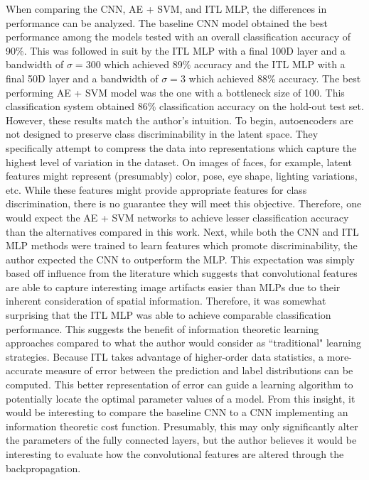 \documentclass[conference]{IEEEtran}
\begin{document}
When comparing the CNN, AE + SVM, and ITL MLP, the differences in performance can be analyzed.  The baseline CNN model obtained the best performance among the models tested with an overall classification accuracy of 90\%.  This was followed in suit by the ITL MLP with a final 100D layer and a bandwidth of $\sigma=300$ which achieved 89\% accuracy and the ITL MLP with a final 50D layer and a bandwidth of $\sigma=3$ which achieved 88\% accuracy.  The best performing AE + SVM model was the one with a bottleneck size of 100.  This classification system obtained 86\% classification accuracy on the hold-out test set.  However, these results match the author's intuition.  To begin, autoencoders are not designed to preserve class discriminability in the latent space.  They specifically attempt to compress the data into  representations which capture the highest level of variation in the dataset.  On images of faces, for example, latent features might represent (presumably) color, pose, eye shape, lighting variations, etc.  While these features might provide appropriate features for class discrimination, there is no guarantee they will meet this objective.  Therefore, one would expect the AE + SVM networks to achieve lesser classification accuracy than the alternatives compared in this work.  Next, while both the CNN and ITL MLP methods were trained to  learn features which promote discriminability, the author expected the CNN to outperform the MLP.  This expectation was simply based off influence from the literature which suggests that convolutional features are able to capture interesting image artifacts easier than MLPs due to their inherent consideration of spatial information.  Therefore, it was somewhat surprising that the ITL MLP was able to achieve comparable classification performance.  This suggests the benefit of information theoretic learning approaches compared to what the author would consider as ``traditional" learning strategies.  Because ITL takes advantage of higher-order data statistics, a more-accurate measure of error between the  prediction and label distributions can be computed.  This better representation of error can guide a learning algorithm to potentially locate  the optimal  parameter values of a model.  From this insight, it would be interesting to compare the baseline CNN to a CNN implementing an information theoretic cost function.  Presumably, this may only significantly alter  the parameters of the fully connected layers, but the author believes it would be interesting to evaluate how the convolutional features are altered through the backpropagation.
\end{document}
